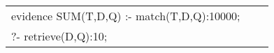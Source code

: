 \begin{tabular}{lcl}
evidence SUM(T,D,Q) :- match(T,D,Q):10000;\\
?- retrieve(D,Q):10;\\
\end{tabular}

